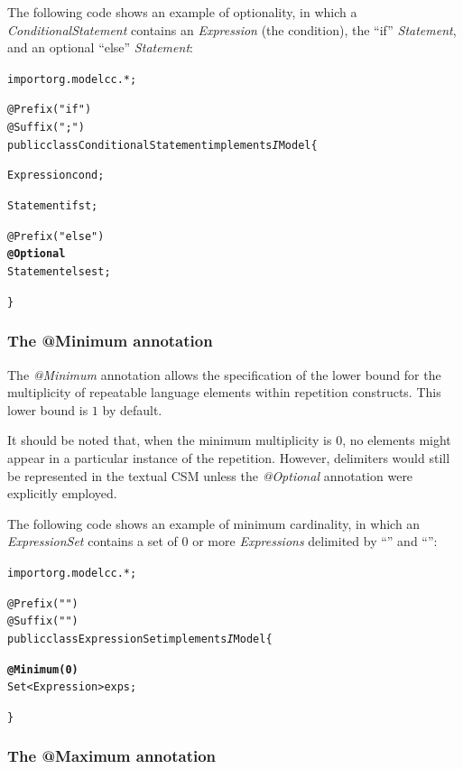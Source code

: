 \documentclass[a4paper,twoside,onecolumn]{article}
\newenvironment{colframe}{%
  \begin{Sbox} 
    \begin{minipage}{.8\columnwidth} 
}{%

  \end{minipage} 
  \end{Sbox} 
  \begin{center} 
    \fcolorbox{black}{MyGray}{\TheSbox} 
  \end{center} 
}
\newcommand{\an}[1]{\emph{#1}} %
\begin{document}
The following code shows an example of optionality, in which a \emph{ConditionalStatement} contains an \emph{Expression} (the condition), the ``if'' \emph{Statement}, and an optional ``else'' \emph{Statement}:

\begin{colframe}
\begin{alltt}
import org.modelcc.*;

@Prefix("if")
@Suffix(";")
public class ConditionalStatement implements{\emph IModel} \{

  Expression cond;

  Statement ifst;

  @Prefix("else")
  {\bf @Optional}
  Statement elsest;

\}
\end{alltt}
\end{colframe}

\subsubsection{The @Minimum annotation}

The \an{@Minimum} annotation allows the specification of the lower bound for the multiplicity of repeatable language elements within repetition constructs. This lower bound is $1$ by default.

It should be noted that, when the minimum multiplicity is $0$, no elements might appear in a particular instance of the repetition. However,
delimiters would still be represented in the textual CSM unless the \an{@Optional} annotation were explicitly employed.

The following code shows an example of minimum cardinality, in which an \emph{ExpressionSet} contains a set of $0$ or more \emph{Expressions} delimited by ``{'' and ``}'':

\begin{colframe}
\begin{alltt}
import org.modelcc.*;

@Prefix("{")
@Suffix("}")
public class ExpressionSet implements{\emph IModel} \{
  
  {\bf @Minimum(0)}
  Set<Expression> exps;

\}
\end{alltt}
\end{colframe}

\subsubsection{The @Maximum annotation}
\end{document}
